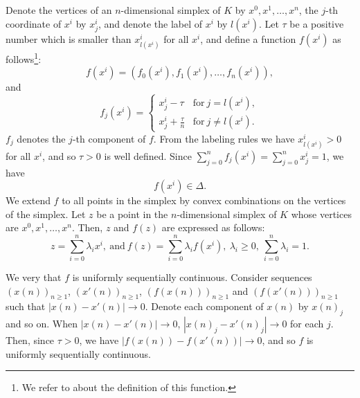 \documentclass[reqno]{amsart}
\begin{document}
Denote the vertices of an $n$-dimensional simplex of $K$ by $x^0, x^1, \dots, x^n$, the $j$-th coordinate of $x^i$ by $x^i_j$, and denote the label of $x^i$ by $l(x^i)$. Let $\tau$ be a positive number which is smaller than $x^i_{l(x^i)}$ for all $x^i$, and define a function $f(x^i)$ as follows\footnote{We refer to \cite{yoseloff} about the definition of this function.}:
\[f(x^i)=(f_0(x^i), f_1(x^i), \dots, f_n(x^i)),\]
and
\begin{equation}
f_j(x^i)=\left\{
\begin{array}{ll}
x^i_j-\tau&\mathrm{for}\ j=l(x^i),\\
x^i_j+\frac{\tau}{n}&\mathrm{for}\ j\neq l(x^i).\label{e0}
\end{array}
\right.
\end{equation}
$f_j$ denotes the $j$-th component of $f$. From the labeling rules we have $x^i_{l(x^i)}>0$ for all $x^i$, and so $\tau>0$ is well defined. Since $\sum_{j=0}^nf_j(x^i)=\sum_{j=0}^nx^i_j=1$, we have
\[f(x^i)\in \Delta.\]
We extend $f$ to all points in the simplex by convex combinations on the vertices of the simplex. Let $z$ be a point in the $n$-dimensional simplex of $K$ whose vertices are $x^0, x^1, \dots, x^n$. Then, $z$ and $f(z)$ are expressed as follows:
\[z=\sum_{i=0}^n\lambda_ix^i,\ \mathrm{and}\ f(z)=\sum_{i=0}^n\lambda_if(x^i),\ \lambda_i\geq 0,\ \sum_{i=0}^n\lambda_i=1.\]

We very that $f$ is uniformly sequentially continuous. Consider sequences $(x(n))_{n\geq 1}$, $(x'(n))_{n\geq 1}$, $(f(x(n)))_{n\geq 1}$ and $(f(x'(n)))_{n\geq 1}$ such that $|x(n)-x'(n)|\longrightarrow 0$. Denote each component of $x(n)$ by $x(n)_j$ and so on. When $|x(n)-x'(n)|\longrightarrow 0$, $|x(n)_j-x'(n)_j|\longrightarrow 0$ for each $j$. Then, since $\tau>0$, we have $|f(x(n))-f(x'(n))|\longrightarrow 0$, and so $f$ is uniformly sequentially continuous.
\end{document}
